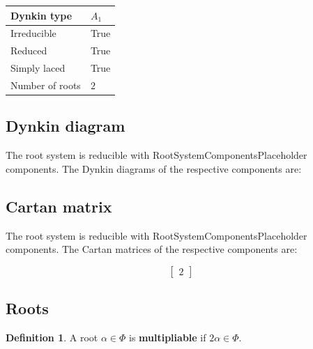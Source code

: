 \documentclass[11pt]{article}
\newcommand{\tbf}{\textbf}
\theoremstyle{definition}
\newtheorem{definition}{Definition}[section]
\newif\ifrootsystemirreducible
\begin{document}
\begin{tabular}{|l|l|}
	\hline
    Dynkin type & $A_1$ \\
	\hline
    Irreducible & True \\
	\hline
    Reduced & True \\
	\hline
	Simply laced & True \\
	\hline
	Number of roots & $2$ \\
	\hline
\end{tabular}

\subsection{Dynkin diagram}

\ifrootsystemirreducible
The root system is irreducible and has Dynkin diagram:
\else
The root system is reducible with RootSystemComponentsPlaceholder components. The Dynkin diagrams of the respective components are:
\fi

\begin{center}
\end{center}

\subsection{Cartan matrix}

\ifrootsystemirreducible
The root system is irreducible and has Cartan matrix:
\else
The root system is reducible with RootSystemComponentsPlaceholder components. The Cartan matrices of the respective components are:
\fi

\[
\left[\begin{matrix}2\end{matrix}\right]
\]

\subsection{Roots}

\begin{definition}
A root $\alpha \in \Phi$ is \tbf{multipliable} if $2\alpha \in \Phi$.
\end{definition}
\end{document}
